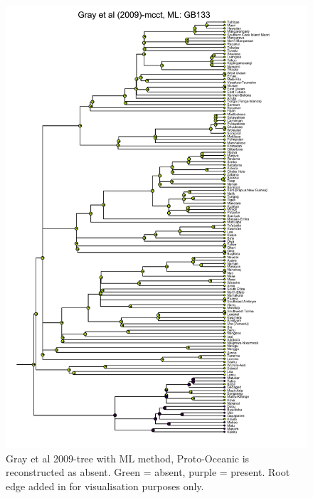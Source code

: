 \documentclass[12pt,letterpaper]{article}
\begin{document}
\begin{figure}[ht]
\centering
\includegraphics[width=14cm]{illustrations/plots_from_R/tree_plots/gray_et_al_2009/ML/ML_gray_mcct_-GB133.png}
\caption{Gray et al 2009-tree with ML method, Proto-Oceanic is reconstructed as absent.  Green = absent, purple = present. Root edge added in for visualisation purposes only.}
\label{fig:ML_gray_mcct}
\end{figure}

%
%
\end{document}
